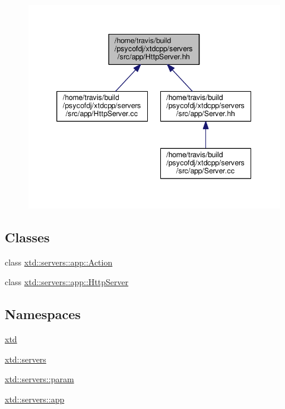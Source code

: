 \begin{figure}[H]
\begin{center}
\leavevmode
\includegraphics[width=345pt]{HttpServer_8hh__dep__incl}
\end{center}
\end{figure}
\subsection*{Classes}
\begin{DoxyCompactItemize}
\item 
class \hyperlink{classxtd_1_1servers_1_1app_1_1Action}{xtd\-::servers\-::app\-::\-Action}
\item 
class \hyperlink{classxtd_1_1servers_1_1app_1_1HttpServer}{xtd\-::servers\-::app\-::\-Http\-Server}
\end{DoxyCompactItemize}
\subsection*{Namespaces}
\begin{DoxyCompactItemize}
\item 
\hyperlink{namespacextd}{xtd}
\item 
\hyperlink{namespacextd_1_1servers}{xtd\-::servers}
\item 
\hyperlink{namespacextd_1_1servers_1_1param}{xtd\-::servers\-::param}
\item 
\hyperlink{namespacextd_1_1servers_1_1app}{xtd\-::servers\-::app}
\end{DoxyCompactItemize}
